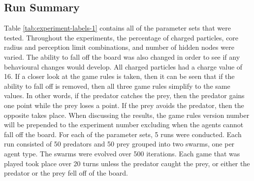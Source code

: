 \subsection{Run Summary}
Table \ref{tab:experiment-labels-1} contains all of the parameter sets that were tested. Throughout the experiments, the percentage of charged particles, core radius and perception limit combinations, and number of hidden nodes were varied. The ability to fall off the board was also changed in order to see if any behavioural changes would develop. All charged particles had a charge value of 16. If a closer look at the game rules is taken, then it can be seen that if the ability to fall off is removed, then all three game rules simplify to the same values. In other words, if the predator catches the prey, then the predator gains one point while the prey loses a point. If the prey avoids the predator, then the opposite takes place. When discussing the results, the game rules version number will be prepended to the experiment number excluding when the agents cannot fall off the board. For each of the parameter sets, 5 runs were conducted. Each run consisted of 50 predators and 50 prey grouped into two swarms, one per agent type. The swarms were evolved over 500 iterations. Each game that was played took place over 20 turns unless the predator caught the prey, or either the predator or the prey fell off of the board.

